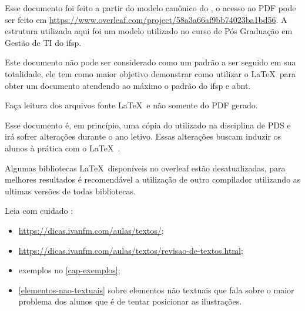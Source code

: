 \newcommand{\urlmodelosimples}{https://www.overleaf.com/project/58a3a66af9bb74023ba1bd56}

\newcommand{\urlmodelo}{\url{\urlmodelosimples}}

Esse documento foi feito a partir do modelo canônico do \abnTeX, o acesso ao PDF pode ser feito em 
\urlmodelo. A estrutura utilizada aqui foi um modelo utilizado no curso de Pós Graduação em Gestão de TI do \ac{ifsp}.


Este documento não pode ser considerado como um padrão a ser seguido em sua totalidade, ele tem como maior objetivo demonstrar como utilizar o \LaTeX\ para obter um documento atendendo ao máximo o padrão do \ac{ifsp} e \ac{abnt}.

Faça leitura dos arquivos fonte \LaTeX\ e não somente do PDF gerado.

Esse documento é, em princípio, uma cópia do utilizado na disciplina de PDS e irá sofrer alterações durante o ano letivo. Essas alterações buscam induzir os alunos à prática com o \LaTeX\ . 

Algumas bibliotecas \LaTeX\ disponíveis no overleaf estão desatualizadas, para melhores resultados é recomendável a utilização de outro compilador utilizando as ultimas versões de todas bibliotecas.

Leia com cuidado :
\begin{itemize}
    \item \url{https://dicas.ivanfm.com/aulas/textos/};
    \item \url{https://dicas.ivanfm.com/aulas/textos/revisao-de-textos.html};
    \item exemplos no \autoref{cap-exemplos};
    \item \autoref{elementos-nao-textuais} sobre elementos não textuais que fala sobre o maior problema dos alunos que é de tentar posicionar as ilustrações.
\end{itemize}


\noindent\hrulefill
